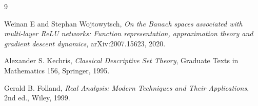 \documentclass[11pt]{article}
\newcommand{\1}{\mathbf 1}
\begin{document}
\begin{thebibliography}{9}

Weinan E and Stephan Wojtowytsch,
\emph{On the Banach spaces associated with multi-layer ReLU networks: Function representation, approximation theory and gradient descent dynamics},
arXiv:2007.15623, 2020.

Alexander S. Kechris,
\emph{Classical Descriptive Set Theory},
Graduate Texts in Mathematics 156, Springer, 1995.

Gerald B. Folland,
\emph{Real Analysis: Modern Techniques and Their Applications},
2nd ed., Wiley, 1999.

\end{thebibliography}
\end{document}
